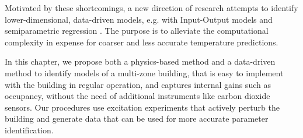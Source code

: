 Motivated by these shortcomings, a new direction of research attempts to identify lower-dimensional, data-driven models, e.g. with Input-Output models \cite{Lin:2015exp} and semiparametric regression \cite{Aswani:2012aa}. The purpose is to alleviate the computational complexity in expense for coarser and less accurate temperature predictions.



In this chapter, we propose both a physics-based method and a data-driven method to identify models of a multi-zone building, that is easy to implement with the building in regular operation, and captures internal gains such as occupancy, without the need of additional instruments like carbon dioxide sensors.
Our procedures use excitation experiments that actively perturb the building and generate data that can be used for more accurate parameter identification.

